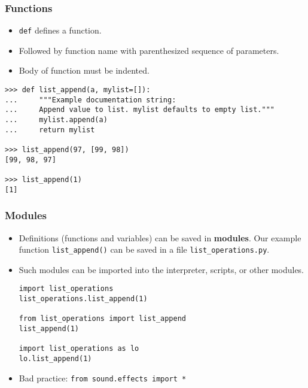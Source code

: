 \begin{frame}[fragile]
    \frametitle{Functions}
    \begin{itemize}
        \item  \texttt{def} defines a function.
        \item Followed by function name with parenthesized sequence of parameters.
        \item Body of function must be indented.
    \end{itemize}
\begin{verbatim}
>>> def list_append(a, mylist=[]):
...     """Example documentation string:
...     Append value to list. mylist defaults to empty list."""
...     mylist.append(a)
...     return mylist

>>> list_append(97, [99, 98])
[99, 98, 97]

>>> list_append(1)
[1]
\end{verbatim}
\end{frame}

\begin{frame}[fragile]
    \frametitle{Modules}
    \begin{itemize}
        \item Definitions (functions and variables) can be saved in
        \textbf{modules}. Our example function
        \texttt{list_append()} can be saved in a file
        \texttt{list_operations.py}.
        \item Such modules can be imported into the interpreter,
        scripts, or other modules.
\begin{verbatim}
import list_operations
list_operations.list_append(1)

from list_operations import list_append
list_append(1)

import list_operations as lo
lo.list_append(1)
\end{verbatim}
        \item Bad practice: \texttt{from sound.effects import *}
    \end{itemize}
\end{frame}

